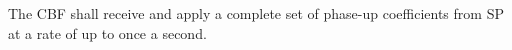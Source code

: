 The CBF shall receive and apply a complete set of phase-up coefficients from
SP at a rate of up to once a second.
